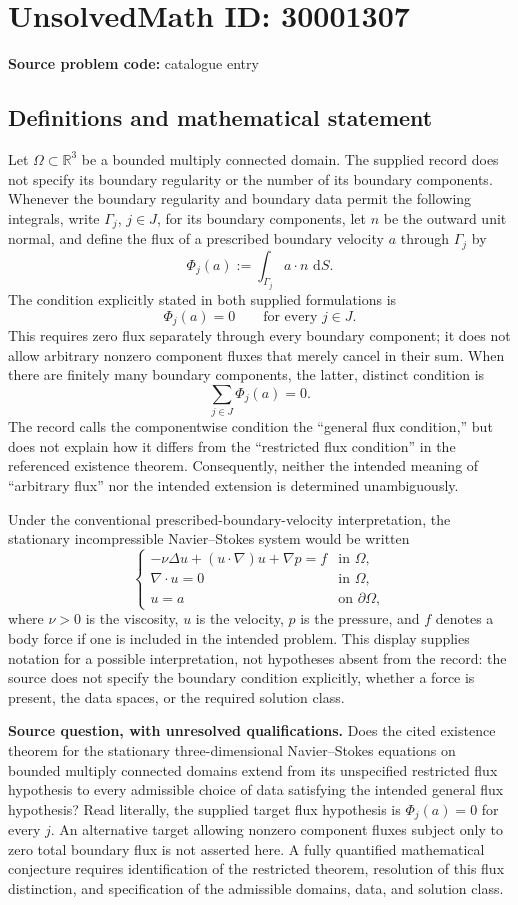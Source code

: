 \documentclass[11pt]{article}
\newcommand{\R}{\mathbb{R}}
\newcommand{\dd}{\,\mathrm{d}}
\begin{document}
\section*{UnsolvedMath ID: 30001307}
\textbf{Source problem code:} catalogue entry
\subsection{Definitions and mathematical statement}
Let \(\Omega\subset\R^3\) be a bounded multiply connected domain. The supplied record does not specify its boundary regularity or the number of its boundary components. Whenever the boundary regularity and boundary data permit the following integrals, write \(\Gamma_j\), \(j\in J\), for its boundary components, let \(n\) be the outward unit normal, and define the flux of a prescribed boundary velocity \(a\) through \(\Gamma_j\) by
\[
\Phi_j(a):=\int_{\Gamma_j}a\cdot n\,\dd S.
\]
The condition explicitly stated in both supplied formulations is
\[
\Phi_j(a)=0\qquad\text{for every }j\in J.
\]
This requires zero flux separately through every boundary component; it does not allow arbitrary nonzero component fluxes that merely cancel in their sum. When there are finitely many boundary components, the latter, distinct condition is
\[
\sum_{j\in J}\Phi_j(a)=0.
\]
The record calls the componentwise condition the ``general flux condition,'' but does not explain how it differs from the ``restricted flux condition'' in the referenced existence theorem. Consequently, neither the intended meaning of ``arbitrary flux'' nor the intended extension is determined unambiguously.

Under the conventional prescribed-boundary-velocity interpretation, the stationary incompressible Navier--Stokes system would be written
\[
\begin{cases}
-\nu\Delta u+(u\cdot\nabla)u+\nabla p=f & \text{in }\Omega,\\
\nabla\cdot u=0 & \text{in }\Omega,\\
u=a & \text{on }\partial\Omega,
\end{cases}
\]
where \(\nu>0\) is the viscosity, \(u\) is the velocity, \(p\) is the pressure, and \(f\) denotes a body force if one is included in the intended problem. This display supplies notation for a possible interpretation, not hypotheses absent from the record: the source does not specify the boundary condition explicitly, whether a force is present, the data spaces, or the required solution class.

\textbf{Source question, with unresolved qualifications.} Does the cited existence theorem for the stationary three-dimensional Navier--Stokes equations on bounded multiply connected domains extend from its unspecified restricted flux hypothesis to every admissible choice of data satisfying the intended general flux hypothesis? Read literally, the supplied target flux hypothesis is \(\Phi_j(a)=0\) for every \(j\). An alternative target allowing nonzero component fluxes subject only to zero total boundary flux is not asserted here. A fully quantified mathematical conjecture requires identification of the restricted theorem, resolution of this flux distinction, and specification of the admissible domains, data, and solution class.
\end{document}
